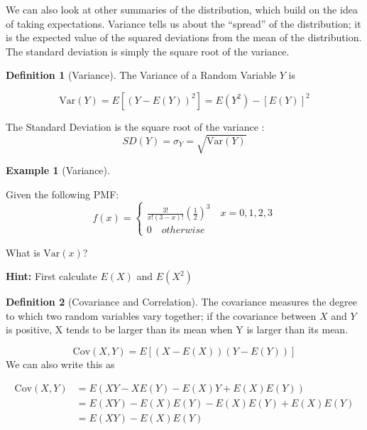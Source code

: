 \documentclass[
]{book}
\theoremstyle{definition}
\newtheorem{definition}{Definition}[chapter]
\theoremstyle{definition}
\newtheorem{example}{Example}[chapter]
\theoremstyle{definition}
\theoremstyle{definition}
\theoremstyle{remark}
\begin{document}
We can also look at other summaries of the distribution, which build on the idea of taking expectations. Variance tells us about the ``spread'' of the distribution; it is the expected value of the squared deviations from the mean of the distribution. The standard deviation is simply the square root of the variance.

\begin{definition}[Variance]
\protect\hypertarget{def:unnamed-chunk-271}{}{\label{def:unnamed-chunk-271} {} }The Variance of a Random Variable \(Y\) is

\[\text{Var}(Y) = E[(Y - E(Y))^2] =  E(Y^2)-[E(Y)]^2\]

The Standard Deviation is the square root of the variance : \[SD(Y) = \sigma_Y= \sqrt{\text{Var}(Y)}\]
\end{definition}

\begin{example}[Variance]
\protect\hypertarget{exm:var}{}{\label{exm:var} {} }

Given the following PMF:
\[f(x) =  \begin{cases}
              \frac{3!}{x!(3-x)!}(\frac{1}{2})^3 \quad x = 0,1,2,3\\
               0 \quad otherwise
            \end{cases}
               \]

What is \(\text{Var}(x)\)?

\textbf{Hint:} First calculate \(E(X)\) and \(E(X^2)\)
\end{example}

\begin{definition}[Covariance and Correlation]
\protect\hypertarget{def:unnamed-chunk-272}{}{\label{def:unnamed-chunk-272} {} }
The covariance measures the degree to which two random variables vary together; if the covariance between \(X\) and \(Y\) is positive, X tends to be larger than its mean when Y is larger than its mean.

\[\text{Cov}(X,Y) = E[(X - E(X))(Y - E(Y))] \]
We can also write this as

\begin{align*}
\text{Cov}(X,Y) &= E\left(XY - XE(Y) - E(X)Y + E(X)E(Y)\right)\\
&= E(XY) - E(X)E(Y) - E(X)E(Y) + E(X)E(Y)\\
&= E(XY) - E(X)E(Y)
\end{align*}
\end{definition}
\end{document}
